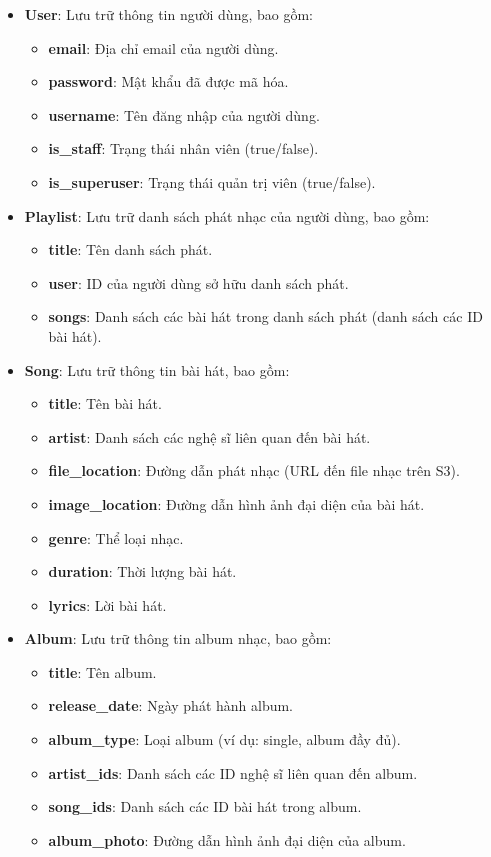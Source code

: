 \begin{itemize}
    \item \textbf{User}: Lưu trữ thông tin người dùng, bao gồm:
    \begin{itemize}
        \item \textbf{email}: Địa chỉ email của người dùng.
        \item \textbf{password}: Mật khẩu đã được mã hóa.
        \item \textbf{username}: Tên đăng nhập của người dùng.
        \item \textbf{is\_staff}: Trạng thái nhân viên (true/false).
        \item \textbf{is\_superuser}: Trạng thái quản trị viên (true/false).
    \end{itemize}

    \item \textbf{Playlist}: Lưu trữ danh sách phát nhạc của người dùng, bao gồm:
    \begin{itemize}
        \item \textbf{title}: Tên danh sách phát.
        \item \textbf{user}: ID của người dùng sở hữu danh sách phát.
        \item \textbf{songs}: Danh sách các bài hát trong danh sách phát (danh sách các ID bài hát).
    \end{itemize}

    \item \textbf{Song}: Lưu trữ thông tin bài hát, bao gồm:
    \begin{itemize}
        \item \textbf{title}: Tên bài hát.
        \item \textbf{artist}: Danh sách các nghệ sĩ liên quan đến bài hát.
        \item \textbf{file\_location}: Đường dẫn phát nhạc (URL đến file nhạc trên S3).
        \item \textbf{image\_location}: Đường dẫn hình ảnh đại diện của bài hát.
        \item \textbf{genre}: Thể loại nhạc.
        \item \textbf{duration}: Thời lượng bài hát.
        \item \textbf{lyrics}: Lời bài hát.
    \end{itemize}

    \item \textbf{Album}: Lưu trữ thông tin album nhạc, bao gồm:
    \begin{itemize}
        \item \textbf{title}: Tên album.
        \item \textbf{release\_date}: Ngày phát hành album.
        \item \textbf{album\_type}: Loại album (ví dụ: single, album đầy đủ).
        \item \textbf{artist\_ids}: Danh sách các ID nghệ sĩ liên quan đến album.
        \item \textbf{song\_ids}: Danh sách các ID bài hát trong album.
        \item \textbf{album\_photo}: Đường dẫn hình ảnh đại diện của album.
    \end{itemize}


\end{itemize}
